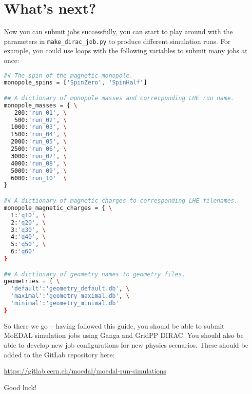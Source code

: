 \section{What's next?}
\label{sec:next}
Now you can submit jobs successfully, you can start to play
around with the parameters in \texttt{make\_dirac\_job.py}
to produce different simulation runs.
For example, you could use loops with the following variables to submit
many jobs at once:

\begin{lstlisting}[gobble=0,numbers=none,language=bash]
## The spin of the magnetic monopole.
monopole_spins = ['SpinZero', 'SpinHalf']

## A dictionary of monopole masses and correcponding LHE run name.
monopole_masses = { \
   200:'run_01', \
   500:'run_02', \
  1000:'run_03', \
  1500:'run_04', \
  2000:'run_05', \
  2500:'run_06', \
  3000:'run_07', \
  4000:'run_08', \
  5000:'run_09', \
  6000:'run_10'  \
}

## A dictionary of magnetic charges to corresponding LHE filenames.
monopole_magnetic_charges = { \
  1:'q10', \
  2:'q20', \
  3:'q30', \
  4:'q40', \
  5:'q50', \
  6:'q60'
}

## A dictionary of geometry names to geometry files.
geometries = { \
  'default':'geometry_default.db', \
  'maximal':'geometry_maximal.db', \
  'minimal':'geometry_minimal.db'
} 
\end{lstlisting}


So there we go -- having followed this guide,
you should be able to submit MoEDAL
simulation jobs using Ganga and GridPP DIRAC.
You should also be able to develop new job configurations
for new physics scenarios. These should be added to
the GitLab repository here:

\href{https://gitlab.cern.ch/moedal/moedal-run-simulations}{https://gitlab.cern.ch/moedal/moedal-run-simulations}

Good luck!
